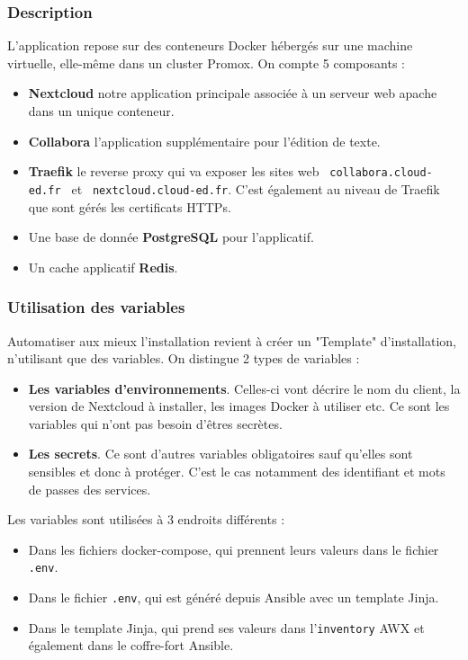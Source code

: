 \documentclass[12pt]{article}
\begin{document}
\subsubsection{Description}
L'application repose sur des conteneurs Docker hébergés sur une machine virtuelle, elle-même dans un cluster Promox. On compte 5 composants :
\begin{itemize}
    \item \textbf{Nextcloud} notre application principale associée à un serveur web apache dans un unique conteneur.
    \item \textbf{Collabora} l'application supplémentaire pour l'édition de texte.
    \item \textbf{Traefik} le reverse proxy qui va exposer les sites web \verb| collabora.cloud-ed.fr | et  \verb| nextcloud.cloud-ed.fr|. C'est également au niveau de Traefik que sont gérés les certificats HTTPs.
    \item Une base de donnée \textbf{PostgreSQL} pour l'applicatif.
    \item Un cache applicatif \textbf{Redis}.
\end{itemize}

\subsubsection{Utilisation des variables}
Automatiser aux mieux l'installation revient à créer un "Template" d'installation, n'utilisant que des variables. On distingue 2 types de variables :
\begin{itemize}
    \item \textbf{Les variables d'environnements}. Celles-ci vont décrire le nom du client, la version de Nextcloud à installer, les images Docker à utiliser etc. Ce sont les variables qui n'ont pas besoin d'êtres secrètes.
    \item \textbf{Les secrets}. Ce sont d'autres variables obligatoires sauf qu'elles sont sensibles et donc à protéger. C'est le cas notamment des identifiant et mots de passes des services.
\end{itemize}

Les variables sont utilisées à 3 endroits différents :
\begin{itemize}
    \item Dans les fichiers docker-compose, qui prennent leurs valeurs dans le fichier \verb|.env|.
    \item Dans le fichier \verb|.env|, qui est généré depuis Ansible avec un template Jinja.
    \item Dans le template Jinja, qui prend ses valeurs dans l'\verb|inventory| AWX et également dans le coffre-fort Ansible.
\end{itemize}
\end{document}
